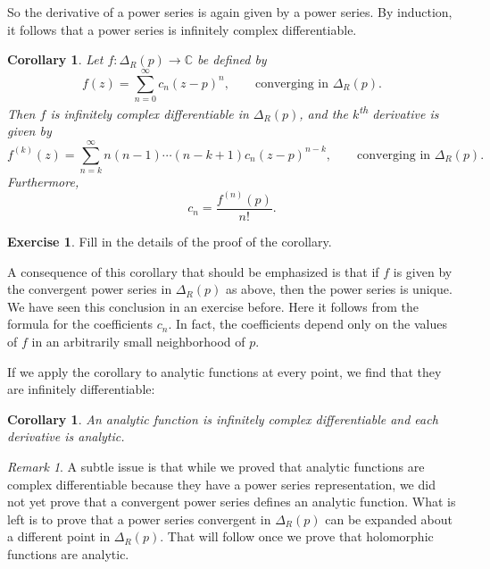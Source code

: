 \documentclass[12pt,openany]{book}
\newcommand{\C}{{\mathbb{C}}}
\theoremstyle{plain}
\newtheorem{cor}[thm]{Corollary}
\theoremstyle{remark}
\newtheorem{remark}[thm]{Remark}
\theoremstyle{definition}
\newenvironment{exbox}{%
    \def\FrameCommand{\vrule width 1pt \relax\hspace{10pt}}%
    \MakeFramed{\advance\hsize-\width\FrameRestore}%
}{%
    \endMakeFramed
}
\theoremstyle{exercise}
\newtheorem{exercise}{Exercise}[section]
\theoremstyle{example}
\begin{document}
So the derivative of a power series is again given by a power series.
By induction, it follows that a power series is infinitely complex
differentiable.

\begin{cor} \label{cor:convpowserinfdif}
\pagebreak[2]
Let $f \colon \Delta_R(p) \to \C$ be defined by
\begin{equation*}
f(z) = \sum_{n=0}^\infty c_n {(z-p)}^n ,
\qquad \text{converging in } \Delta_R(p) .
\end{equation*}
Then $f$ is infinitely complex differentiable in $\Delta_R(p)$,
and the $k$\textsuperscript{th} derivative is given by
\begin{equation*}
f^{(k)}(z) = \sum_{n=k}^\infty n(n-1)\cdots(n-k+1) c_n {(z-p)}^{n-k} ,
\qquad \text{converging in } \Delta_R(p) .
\end{equation*}
Furthermore,
\begin{equation*}
c_n =
\frac{f^{(n)}(p)}{n!} .
\end{equation*}
\end{cor}

\begin{exbox}
\begin{exercise}
Fill in the details of the proof of the corollary.
\end{exercise}
\end{exbox}

A consequence of this corollary that should be
emphasized is that if $f$ is given by the convergent power series in
$\Delta_R(p)$ as above, then the power series is unique.
We have seen this conclusion in an exercise before.
Here it
follows from the formula for the coefficients $c_n$.  In fact, the
coefficients depend only on the values of $f$ in an arbitrarily small
neighborhood of $p$.

If we apply the corollary to analytic functions at every point,
we find that they are infinitely differentiable:

\begin{cor} \label{cor:analinfdif}
An analytic function is infinitely complex differentiable and each
derivative is analytic.
\end{cor}

\begin{remark}
A subtle issue is that while we proved that analytic functions are
complex differentiable because they have a power series representation,
we did not yet prove that a convergent power series defines an analytic
function.  What is left is to prove that a power series convergent
in $\Delta_R(p)$ can be
expanded about a different point in $\Delta_R(p)$.  That will follow
once we prove that holomorphic functions are analytic.
\end{remark}
\end{document}
